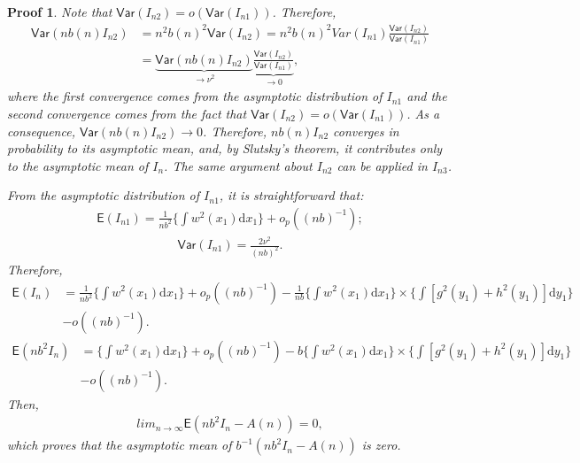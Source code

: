 \documentclass{article}
\newtheorem{Proof}{Proof}[section]
\begin{document}
\begin{Proof}
    Note that $\mathsf{Var}(I_{n2}) = o(\mathsf{Var}(I_{n1}))$. Therefore,
    \begin{align}
        \mathsf{Var}(nb(n)I_{n2}) &= n^2b(n)^2 \mathsf{Var}(I_{n2}) = n^2b(n)^2 Var(I_{n1}) \frac{\mathsf{Var}(I_{n2})}{\mathsf{Var}(I_{n1})} \\
        &= \underset{\to \nu^2}{\underbrace{\mathsf{Var}(nb(n)I_{n2})}} \underset{\to 0}{\underbrace{\frac{\mathsf{Var}(I_{n2})}{\mathsf{Var}(I_{n1})}}}, 
    \end{align}
    where the first convergence comes from the asymptotic distribution of $I_{n1}$ and the second convergence comes from the fact that $\mathsf{Var}(I_{n2}) = o(\mathsf{Var}(I_{n1}))$. As a consequence, $\mathsf{Var}(nb(n)I_{n2}) \to 0$. Therefore, $nb(n)I_{n2}$ converges in probability to its asymptotic mean, and, by Slutsky's theorem, it contributes only to the asymptotic mean of $I_n$. The same argument about $I_{n2}$ can be applied in $I_{n3}$.

    From the asymptotic distribution of $I_{n1}$, it is straightforward that:
    \begin{align}
        \mathsf{E} (I_{n1}) = \frac{1}{nb^2} \Bigg\{ \int w^2(x_1) \mathrm{d} x_1 \Bigg\} + o_p((nb)^{-1}); 
    \end{align}
    \begin{align}
        \mathsf{Var} (I_{n1}) = \frac{2 \nu^2}{(nb)^2}.
    \end{align}
    Therefore,
    \begin{align}
        \mathsf{E} (I_n) &= \frac{1}{nb^2} \Bigg\{ \int w^2(x_1) \mathrm{d} x_1 \Bigg\} + o_p((nb)^{-1}) -  \frac{1}{nb} \Bigg\{ \int w^2(x_1) \mathrm{d} x_1 \Bigg\} \times \Bigg\{ \int [g^2(y_1) + h^2(y_1)] \mathrm{d} y_1 \Bigg\} \\ &- o((nb)^{-1}).
    \end{align}
    \begin{align}
        \mathsf{E} (nb^2 I_n) &= \Bigg\{ \int w^2(x_1) \mathrm{d} x_1 \Bigg\} + o_p((nb)^{-1}) -  b \Bigg\{ \int w^2(x_1) \mathrm{d} x_1 \Bigg\} \times \Bigg\{ \int [g^2(y_1) + h^2(y_1)] \mathrm{d} y_1 \Bigg\} \\ &- o((nb)^{-1}).
    \end{align}
    Then,
    \begin{align}
        lim_{n \to \infty} \mathsf{E} (nb^2 I_n - A(n)) = 0,
    \end{align}
    which proves that the asymptotic mean of $b^{-1} (nb^2 I_n - A(n))$ is zero.


\end{Proof}
\end{document}
